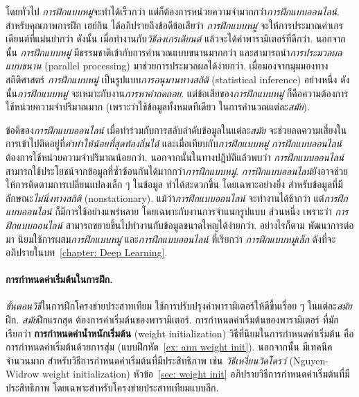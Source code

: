 โดยทั่วไป
\textit{การฝึกแบบหมู่}จะทำได้เร็วกว่า
แต่ก็ต้องการหน่วยความจำมากกว่า\textit{การฝึกแบบออนไลน์}.
สำหรับคุณภาพการฝึก
เฮย์กิน\cite{Haykin2009a}
ได้อภิปรายถึงข้อดีข้อเสียว่า
\textit{การฝึกแบบหมู่}
จะให้การประมาณค่าเกรเดียนต์ที่แม่นยำกว่า ดังนั้น
เมื่อทำงานกับ\textit{วิธีลงเกรเดียนต์}
แล้วจะได้ค่าพารามิเตอร์ที่ดีกว่า.
นอกจากนั้น \textit{การฝึกแบบหมู่}
มีธรรมชาติเข้ากับการคำนวณแบบขนานมากกว่า และสามารถนำ\textit{การประมวลผลแบบขนาน} (parallel processing) มาช่วยการประมวลผลได้ง่ายกว่า.
เมื่อมองจากมุมมองทางสถิติศาสตร์ \textit{การฝึกแบบหมู่}
เป็นรูปแบบ\textit{การอนุมานทางสถิติ} (statistical inference) อย่างหนึ่ง 
ดังนั้น\textit{การฝึกแบบหมู่}
จะเหมาะกับงาน\textit{การหาค่าถดถอย}.
แต่ข้อเสียของ\textit{การฝึกแบบหมู่} ก็คือความต้องการใช้หน่วยความจำปริมาณมาก
(เพราะว่าใช้ข้อมูลทั้งหมดทีเดียว ในการคำนวณแต่ละ\textit{สมัย}).

ข้อดีของ\textit{การฝึกแบบออนไลน์}
เมื่อทำร่วมกับการสลับลำดับข้อมูลในแต่ละ\textit{สมัย}
จะช่วยลดความเสี่ยงในการเข้าไปติดอยู่ที่\textit{ค่าทำให้น้อยที่สุดท้องถิ่นได้}
และเมื่อเทียบกับ\textit{การฝึกแบบหมู่} \textit{การฝึกแบบออนไลน์} ต้องการใช้หน่วยความจำปริมาณน้อยกว่า.
นอกจากนั้นในทางปฎิบัติแล้วพบว่า \textit{การฝึกแบบออนไลน์} สามารถใช้ประโยชน์จากข้อมูลที่ซ้ำซ้อนกันได้มากกว่า\textit{การฝึกแบบหมู่}.
\textit{การฝึกแบบออนไลน์}ยังอาจช่วยให้การติดตามการเปลี่ยนแปลงเล็ก ๆ ในข้อมูล 
ทำได้สะดวกขึ้น โดยเฉพาะอย่างยิ่ง
สำหรับข้อมูลที่มีลักษณะ\textit{ไม่นิ่งทางสถิติ} (nonstationary).
แม้ว่า\textit{การฝึกแบบออนไลน์}
จะทำงานได้ช้ากว่า
แต่\textit{การฝึกแบบออนไลน์}
ก็มีการใช้อย่างแพร่หลาย
โดยเฉพาะกับงานการจำแนกรูปแบบ
ส่วนหนึ่ง เพราะว่า \textit{การฝึกแบบออนไลน์}
สามารถขยายขึ้นไปทำงานกับข้อมูลขนาดใหญได้ง่ายกว่า.
อย่างไรก็ตาม
พัฒนาการต่อมา 
นิยมใช้การผสม\textit{การฝึกแบบหมู่}
และ\textit{การฝึกแบบออนไลน์}
ที่เรียกว่า
\textit{การฝึกแบบหมู่เล็ก} ดังที่จะอภิปรายในบท~\ref{chapter: Deep Learning}.

\paragraph{การกำหนดค่าเริ่มต้นในการฝึก.}
\textit{ขั้นตอนวิธี}ในการฝึกโครงข่ายประสาทเทียม
ใช้การปรับปรุงค่าพารามิเตอร์ให้ดีขึ้นเรื่อย ๆ
ในแต่ละ\textit{สมัย}ฝึก.
\textit{สมัย}ฝึกแรกสุด 
ต้องการค่าเริ่มต้นของพารามิเตอร์.
การกำหนดค่าเริ่มต้นของพารามิเตอร์
ที่มักเรียกว่า \textbf{การกำหนดค่าน้ำหนักเริ่มต้น} (weight initialization)
วิธีที่นิยมในการกำหนดค่าเริ่มต้น
คือการกำหนดค่าเริ่มต้นด้วยการสุ่ม
(แบบฝึกหัด~\ref{ex: ann weight init}).
นอกจากนั้น 
มีเทคนิคจำนวนมาก สำหรับวิธีการกำหนดค่าเริ่มต้นที่มีประสิทธิภาพ เช่น 
\textit{วิธีเหงี่ยนวิดโดรว์} (Nguyen-Widrow weight initialization\cite{NguyenWidrow1990a}) 
หัวข้อ~\ref{sec: weight init}
อภิปรายวิธีการกำหนดค่าเริ่มต้นที่มีประสิทธิภาพ
โดยเฉพาะสำหรับโครงข่ายประสาทเทียมแบบลึก.


